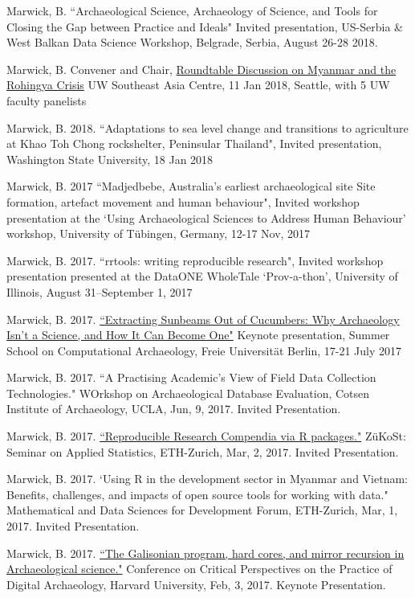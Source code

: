 \ind Marwick, B. ``Archaeological Science, Archaeology of Science, and Tools for Closing the Gap between Practice and Ideals" Invited presentation, US-Serbia \& West Balkan Data Science Workshop, Belgrade, Serbia, August 26-28 2018.

\ind Marwick, B. Convener and Chair, \href{https://jsis.washington.edu/seac/news/roundtable-discussion-myanmar-rohingya-crisis-2/}{Roundtable Discussion on Myanmar and the Rohingya Crisis} UW Southeast Asia Centre, 11 Jan 2018, Seattle, with 5 UW faculty panelists

\ind Marwick, B. 2018. ``Adaptations to sea level change and transitions to agriculture at Khao Toh Chong rockshelter, Peninsular Thailand", Invited presentation, Washington State University, 18 Jan 2018

\ind Marwick, B. 2017 ``Madjedbebe, Australia's earliest archaeological site Site formation, artefact movement and human behaviour", Invited workshop presentation at the ‘Using Archaeological Sciences to Address Human Behaviour’ workshop, University of Tübingen, Germany, 12-17 Nov, 2017

\ind Marwick, B. 2017. ``rrtools: writing reproducible research", Invited workshop presentation presented at the DataONE WholeTale ‘Prov-a-thon’, University of Illinois, August 31–September 1, 2017

\ind Marwick, B. 2017. \href{https://github.com/benmarwick/berlinsummerschoolkeynote}{``Extracting Sunbeams Out of Cucumbers: Why Archaeology Isn't a Science, and How It Can Become One"} Keynote presentation, Summer School on Computational Archaeology, Freie Universität Berlin, 17-21 July 2017

\ind Marwick, B. 2017. ``A Practising Academic’s View of Field Data Collection Technologies." WOrkshop on Archaeological Database Evaluation, Cotsen Institute of Archaeology, UCLA,  Jun, 9, 2017. Invited Presentation.

\ind Marwick, B. 2017. \href{https://github.com/benmarwick/ETH-Zurich-ZuKoSt-Reproducible-Research-Compendia-via-R-packages}{``Reproducible Research Compendia via R packages."} ZüKoSt: Seminar on Applied Statistics, ETH-Zurich,  Mar, 2, 2017. Invited Presentation.

\ind Marwick, B. 2017. `Using R in the development sector in Myanmar and Vietnam: Benefits, challenges, and impacts of open source tools for working with data." Mathematical and Data Sciences for Development Forum, ETH-Zurich,  Mar, 1, 2017. Invited Presentation.

\ind Marwick, B. 2017. \href{https://www.youtube.com/watch?v=k3Wv4Cnr0Nc}{``The Galisonian program, hard cores, and mirror recursion in Archaeological science."} Conference on Critical Perspectives on the Practice of Digital Archaeology, Harvard University,  Feb, 3, 2017. Keynote Presentation.

